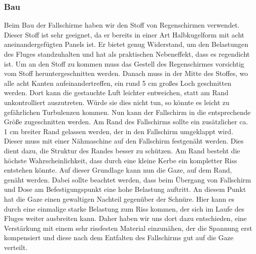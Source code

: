 \subsubsection{Bau}
Beim Bau der Fallschirme haben wir den Stoff von Regenschirmen verwendet. Dieser Stoff ist sehr geeignet, da er bereits in einer Art Halbkugelform mit acht aneinandergefügten Panels ist. Er bietet genug Widerstand, um den Belastungen des Fluges standzuhalten und hat als praktischen Nebeneffekt, dass es regendicht ist. Um an den Stoff zu kommen muss das Gestell des Regenschirmes vorsichtig vom Stoff heruntergeschnitten werden. Danach muss in der Mitte des Stoffes, wo alle acht Kanten aufeinandertreffen, ein rund 5 cm großes Loch geschnitten werden. Dort kann die gestauchte Luft leichter entweichen, statt am Rand unkontrolliert auszutreten. Würde sie dies nicht tun, so könnte es leicht zu gefährlichen Turbulenzen kommen. Nun kann der Fallschirm in die entsprechende Größe zugeschnitten werden. Am Rand des Fallschirms sollte ein zusätzlicher ca. 1 cm breiter Rand gelassen werden, der in den Fallschirm umgeklappt wird. Dieser muss mit einer Nähmaschine auf den Fallschirm festgenäht werden. Dies dient dazu, die Struktur des Randes besser zu schützen. Am Rand besteht die höchste Wahrscheinlichkeit, dass durch eine kleine Kerbe ein kompletter Riss entstehen könnte. Auf dieser Grundlage kann nun die Gaze, auf dem Rand, genäht werden. Dabei sollte beachtet werden, dass beim Übergang von Fallschirm und Dose am Befestigungspunkt eine hohe Belastung auftritt. An diesem Punkt hat die Gaze einen gewaltigen Nachteil gegenüber der Schnüre. Hier kann es durch eine einmalige starke Belastung zum Riss kommen, der sich im Laufe des Fluges weiter ausbreiten kann. Daher haben wir uns dort dazu entschieden, eine Verstärkung mit einem sehr rissfesten Material einzunähen, der die Spannung erst kompensiert und diese nach dem Entfalten des Fallschirms gut auf die Gaze verteilt.